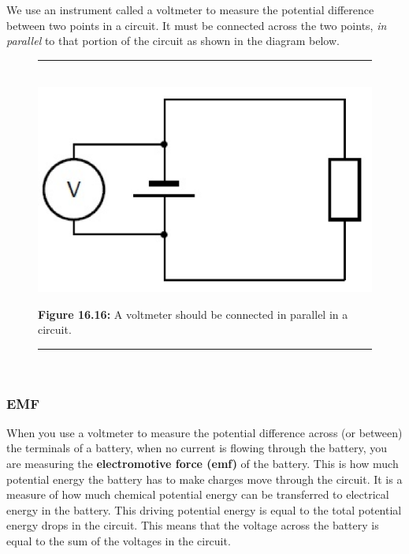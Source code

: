 	
	\label{m38772*sp1}
	  We use an instrument called a voltmeter to measure the potential difference between two points in a circuit. It must be connected across the two points, \textsl{in parallel} to that portion of the circuit as shown in the diagram below.
	\par   
        
    \setcounter{subfigure}{0}


	\begin{figure}[H] %
    \begin{center}
    \rule[.1in]{\figurerulewidth}{.005in} \\
        \label{m38772*uid73s1!!!underscore!!!media}\label{m38772*uid73s1!!!underscore!!!printimage}\includegraphics[width=0.4\columnwidth]{col11305.imgs/m38772_PG10C9_034.png} %
        
      \vspace{2pt}
    \vspace{\rubberspace}\par \begin{cnxcaption}
	  \small \textbf{Figure 16.16: }A voltmeter should be connected in parallel in a circuit.
	\end{cnxcaption}
      
    \vspace{.1in}
    \rule[.1in]{\figurerulewidth}{.005in} \\
        
    \end{center}

 \end{figure}   

    \addtocounter{footnote}{-0}
    
      \label{m38772*uid45}
            \subsubsection{ EMF}
            \nopagebreak
            
        
        \label{m38772*id64666}When you use a voltmeter to measure the potential difference across (or between) the terminals of a battery, when no current is flowing through the battery, you are measuring the \textbf{electromotive force (emf)} of the battery. This is how much potential energy the battery has to make charges move through the circuit. It is a measure of how much chemical potential energy can be transferred to electrical energy in the battery. This driving potential energy is equal to the total potential energy drops in the circuit. This means that the voltage across the battery is equal to the sum of the voltages in the circuit.

